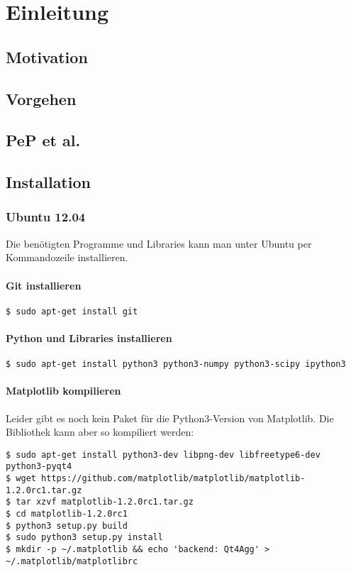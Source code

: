 \documentclass[a4paper,11pt,oneside]{scrbook}
\begin{document}
\mytitle{\today}
\newpage
\tableofcontents

\chapter{Einleitung}
\section{Motivation}
\section{Vorgehen}
\section{PeP et al.}

\section{Installation}

\subsection{Ubuntu 12.04}
Die benötigten Programme und Libraries kann man unter Ubuntu per Kommandozeile installieren.

\subsubsection{Git installieren}
\begin{verbatim}
$ sudo apt-get install git
\end{verbatim}

\subsubsection{Python und Libraries installieren}
\begin{verbatim}
$ sudo apt-get install python3 python3-numpy python3-scipy ipython3
\end{verbatim}

\subsubsection{Matplotlib kompilieren}

Leider gibt es noch kein Paket für die Python3-Version von Matplotlib.
Die Bibliothek kann aber so kompiliert werden:

\begin{verbatim}
$ sudo apt-get install python3-dev libpng-dev libfreetype6-dev python3-pyqt4
$ wget https://github.com/matplotlib/matplotlib/matplotlib-1.2.0rc1.tar.gz
$ tar xzvf matplotlib-1.2.0rc1.tar.gz
$ cd matplotlib-1.2.0rc1
$ python3 setup.py build
$ sudo python3 setup.py install
$ mkdir -p ~/.matplotlib && echo 'backend: Qt4Agg' > ~/.matplotlib/matplotlibrc
\end{verbatim}
\end{document}
